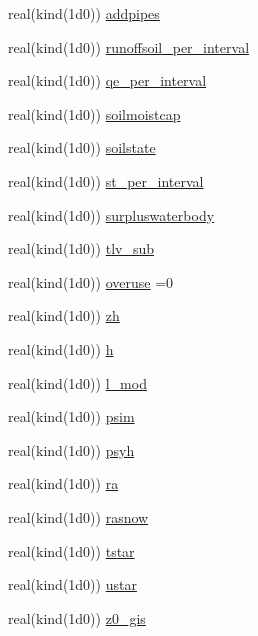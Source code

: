 \begin{DoxyCompactItemize}
\item 
real(kind(1d0)) \hyperlink{namespacesues__data_a58a8108dff93f602ad2ef840fef9395f}{addpipes}
\item 
real(kind(1d0)) \hyperlink{namespacesues__data_ae3658e6cd4c5115a1a9f8ea57cf6f6b1}{runoffsoil\+\_\+per\+\_\+interval}
\item 
real(kind(1d0)) \hyperlink{namespacesues__data_a63a7c6317d6086404efee7da0d9be4da}{qe\+\_\+per\+\_\+interval}
\item 
real(kind(1d0)) \hyperlink{namespacesues__data_ada5a214d0c4d5da587baa5f8de1da6d9}{soilmoistcap}
\item 
real(kind(1d0)) \hyperlink{namespacesues__data_afa546047f4e8bd032736a6915fe1cffd}{soilstate}
\item 
real(kind(1d0)) \hyperlink{namespacesues__data_a2de83c53a6d33bd6f917cf0418fe3d50}{st\+\_\+per\+\_\+interval}
\item 
real(kind(1d0)) \hyperlink{namespacesues__data_ac93567a8ca56d05105523626613f5cc4}{surpluswaterbody}
\item 
real(kind(1d0)) \hyperlink{namespacesues__data_a45028b146a251db48e2682b486211654}{tlv\+\_\+sub}
\item 
real(kind(1d0)) \hyperlink{namespacesues__data_aa663cd30d361709a541de0a9d406557e}{overuse} =0
\item 
real(kind(1d0)) \hyperlink{namespacesues__data_a738f60744a0e91f90a050542ad946898}{zh}
\item 
real(kind(1d0)) \hyperlink{namespacesues__data_ae76235b1ac6a388886f63eb27a0905dd}{h}
\item 
real(kind(1d0)) \hyperlink{namespacesues__data_a7623dce80601c63b78d744b4a5036ad2}{l\+\_\+mod}
\item 
real(kind(1d0)) \hyperlink{namespacesues__data_ab35a12f588d9dfb72d0ec039e806d3bb}{psim}
\item 
real(kind(1d0)) \hyperlink{namespacesues__data_a6d5d62e6767411fff0b1641fe6cbf1f9}{psyh}
\item 
real(kind(1d0)) \hyperlink{namespacesues__data_aafce3a183c34dd4df5268cdbfc8aea24}{ra}
\item 
real(kind(1d0)) \hyperlink{namespacesues__data_a2a84935439f246e72f5de7bd752888f1}{rasnow}
\item 
real(kind(1d0)) \hyperlink{namespacesues__data_a6d0dd8d535aa36ca406b9c4ba99caef6}{tstar}
\item 
real(kind(1d0)) \hyperlink{namespacesues__data_a3422c30d52ea500ca138d13670403a50}{ustar}
\item 
real(kind(1d0)) \hyperlink{namespacesues__data_a7c7f724d95b99e3b5ff7e350e70f1fb1}{z0\+\_\+gis}

\end{DoxyCompactItemize}

